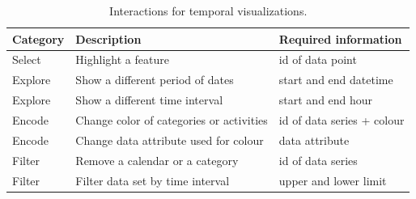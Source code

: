 \begin{table}
  \caption{Interactions for temporal visualizations.}%
  \label{tab:analysis:temporal:interactions}
  \begin{tabularx}{\linewidth}{lXX}
    \bf Category & \bf Description & \bf Required information \\
    \hline
    Select & Highlight a feature & id of data point \\
    Explore & Show a different period of dates & start and end datetime \\
    Explore & Show a different time interval & start and end hour\\
    Encode & Change color of categories or activities & id of data series + colour \\
    Encode & Change data attribute used for colour & data attribute \\
    Filter & Remove a calendar or a category & id of data series \\
    Filter & Filter data set by time interval & upper and lower limit \\
  \end{tabularx}
\end{table}


